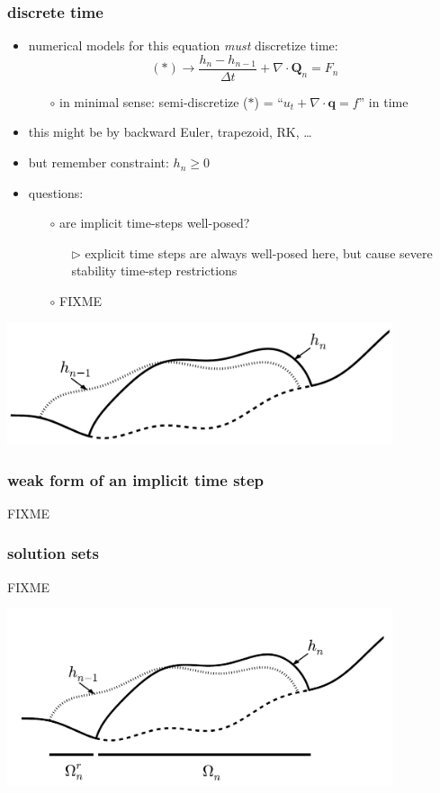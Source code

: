 \documentclass[hide notes,intlimits]{beamer}
\newcommand{\bQ}{\mathbf{Q}}
\newcommand{\bq}{\mathbf{q}}
\newcommand{\Div}{\nabla\cdot}
\begin{document}
\begin{frame}
  \frametitle{discrete time}
\begin{itemize}
\item numerical models for this equation \emph{must} discretize time:
  $$(\ast) \longrightarrow \frac{h_n - h_{n-1}}{\Delta t} + \Div \bQ_n = F_n$$
  \begin{itemize}
  \item[$\circ$] in minimal sense: semi-discretize ($\ast$) = ``$u_t + \Div \bq = f$'' in time
  \end{itemize}
\item this might be by backward Euler, trapezoid, RK, \dots
\item but remember constraint: $h_n \ge 0$
\item questions:
  \begin{itemize}
  \item[$\circ$] are implicit time-steps well-posed?
    \begin{itemize}
    \item[$\triangleright$] explicit time steps are always well-posed here, but cause severe stability time-step restrictions
    \end{itemize}
  \item[$\circ$] FIXME
  \end{itemize}
\end{itemize}
\begin{center}
\includegraphics[width=0.85\textwidth,keepaspectratio=true]{cartoon-sets-crop}
\end{center}
\end{frame}


\begin{frame}
  \frametitle{weak form of an implicit time step}
FIXME
\end{frame}


\begin{frame}
  \frametitle{solution sets}
FIXME

\begin{center}
\includegraphics[width=0.85\textwidth,keepaspectratio=true]{cartoon-sets}
\end{center}
\end{frame}
\end{document}
